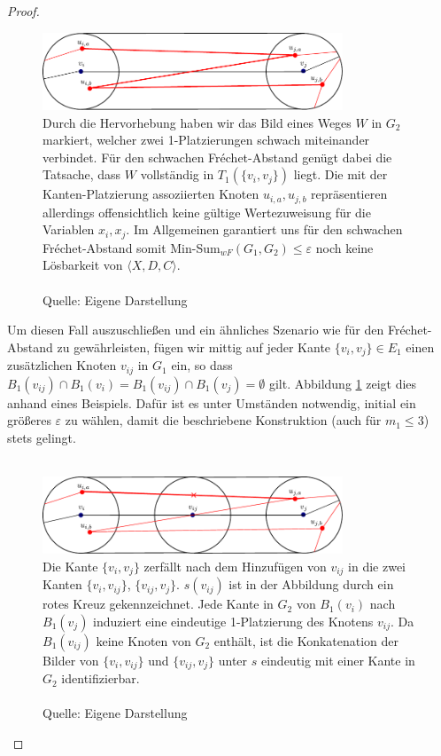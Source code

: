 \documentclass[a4paper, 12pt, twoside]{article}
\theoremstyle{Format1} %
\begin{document}
\begin{proof}
\begin{figure}[H]
    \centering
    \includegraphics[width=0.8\textwidth]{chapter_4_example_0.pdf}
    \caption{Durch die Hervorhebung haben wir das Bild eines Weges $W$ in $G_2$ markiert, welcher zwei 1-Platzierungen schwach miteinander verbindet.
	Für den schwachen Fréchet-Abstand genügt dabei die Tatsache, dass $W$ vollständig in $T_1(\{v_i,v_j\})$ liegt.
	Die mit der Kanten-Platzierung assoziierten Knoten $u_{i,a},u_{j,b}$ repräsentieren allerdings offensichtlich keine gültige Wertezuweisung für die Variablen $x_i,x_j$.
	Im Allgemeinen garantiert uns für den schwachen Fréchet-Abstand somit Min-Sum$_{wF}(G_1,G_2) \leq \varepsilon$ noch keine Lösbarkeit von $\langle X,D,C \rangle$.
	\\
	\\
	Quelle: Eigene Darstellung
	}
\end{figure}

Um diesen Fall auszuschließen und ein ähnliches Szenario wie für den Fréchet-Abstand zu gewährleisten, fügen wir mittig auf jeder Kante $\{v_i, v_j\} \in E_1$
einen zusätzlichen Knoten $v_{ij}$ in $G_1$ ein, so dass $B_1(v_{ij}) \cap B_1(v_i) = B_1(v_{ij}) \cap B_1(v_j) = \emptyset$ gilt. Abbildung \ref{fig:chapter_4_example_1}
zeigt dies anhand eines Beispiels.
Dafür ist es unter Umständen notwendig, initial ein größeres $\varepsilon$ zu wählen, damit die beschriebene Konstruktion (auch für $m_1 \leq 3$) stets gelingt.
\\
\\
\begin{figure}[H]
    \centering
    \includegraphics[width=0.8\textwidth]{chapter_4_example_1.pdf}
    \caption{
	Die Kante $\{v_i, v_j\}$ zerfällt nach dem Hinzufügen von $v_{ij}$ in die zwei Kanten $\{v_i, v_{ij}\}$, $\{v_{ij},v_j\}$.
	$s(v_{ij})$ ist in der Abbildung durch ein rotes Kreuz gekennzeichnet.
	Jede Kante in $G_2$ von $B_1(v_i)$ nach $B_1(v_j)$ induziert eine eindeutige 1-Platzierung
	des Knotens $v_{ij}$. Da $B_1(v_{ij})$ keine Knoten von $G_2$ enthält, ist die Konkatenation der Bilder von $\{v_i,v_{ij}\}$ und $\{v_{ij},v_j\}$
	unter $s$ eindeutig mit einer Kante in $G_2$ identifizierbar.
	\\
	\\
	Quelle: Eigene Darstellung
	}
    \label{fig:chapter_4_example_1}
\end{figure}


\end{proof}
\end{document}

